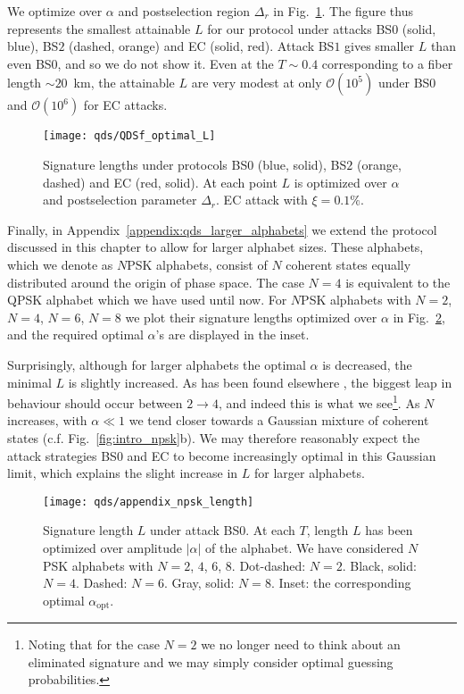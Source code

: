 We optimize over $\alpha$ and postselection region $\Delta_r$ in Fig.~\ref{fig:qds_optimal_L}. The figure thus represents the smallest attainable $L$ for our protocol under attacks BS$0$ (solid, blue), BS$2$ (dashed, orange) and EC (solid, red). Attack BS$1$ gives smaller $L$ than even BS$0$, and so we do not show it. Even at the $T \sim 0.4$ corresponding to a fiber length $\sim 20$~km, the attainable $L$ are very modest at only $\mathcal{O}\left(10^5\right)$ under BS$0$ and $\mathcal{O}\left(10^6\right)$ for EC attacks. 


\begin{figure}[htp]
\captionsetup{width=0.8\linewidth}
\centering
\texttt{[image: qds/QDSf\_optimal\_L]}
\caption{\label{fig:qds_optimal_L} Signature lengths under protocols BS$0$ (blue, solid), BS$2$ (orange, dashed) and EC (red, solid). At each point $L$ is optimized over $\alpha$ and postselection parameter $\Delta_r$. EC attack with $\xi = 0.1\%$.}
\end{figure}

Finally, in Appendix~\ref{appendix:qds_larger_alphabets} we extend the protocol discussed in this chapter to allow for larger alphabet sizes. These alphabets, which we denote as $N$PSK alphabets, consist of $N$ coherent states equally distributed around the origin of phase space. The case $N=4$ is equivalent to the QPSK alphabet which we have used until now. For $N$PSK alphabets with $N=2$, $N=4$, $N=6$, $N=8$ we plot their signature lengths optimized over $\alpha$ in Fig.~\ref{fig:qds_npsk_length_body}, and the required optimal $\alpha$'s are displayed in the inset. 

Surprisingly, although for larger alphabets the optimal $\alpha$ is decreased, the minimal $L$ is slightly increased. As has been found elsewhere \cite{Leverrier2011}, the biggest leap in behaviour should occur between $2 \rightarrow 4$, and indeed this is what we see\footnote{Noting that for the case $N=2$ we no longer need to think about an eliminated signature and we may simply consider optimal guessing probabilities.}. As $N$ increases, with $\alpha \ll 1$ we tend closer towards a Gaussian mixture of coherent states (c.f. Fig.~\ref{fig:intro_npsk}b). We may therefore reasonably expect the attack strategies BS$0$ and EC to become increasingly optimal in this Gaussian limit, which explains the slight increase in $L$ for larger alphabets.

\begin{figure}[htp]
\captionsetup{width=0.8\linewidth}
\centering
\texttt{[image: qds/appendix\_npsk\_length]}
\caption{\label{fig:qds_npsk_length_body} Signature length $L$ under attack BS$0$. At each $T$, length $L$ has been optimized over amplitude $\left|\alpha\right|$ of the alphabet. We have considered $N$PSK alphabets with $N = 2$, $4$, $6$, $8$. Dot-dashed: $N=2$. Black, solid: $N = 4$. Dashed: $N = 6$. Gray, solid: $N = 8$. Inset: the corresponding optimal $\alpha_{\text{opt}}$. } %
\end{figure}

